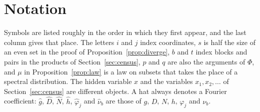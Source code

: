 \documentclass[11pt]{amsart}
\theoremstyle{remark}
\begin{document}
\appendix
\section{Notation}\label{app:notation}

Symbols are listed roughly in the order in which they first appear, and the last column gives that place. The letters $i$ and $j$ index coordinates, $s$ is half the size of an even set in the proof of Proposition~\ref{prop:diverge}, $b$ and $t$ index blocks and pairs in the products of Section~\ref{sec:census}, $p$ and $q$ are also the arguments of $\Phi$, and $\mu$ in Proposition~\ref{prop:law} is a law on subsets that takes the place of a spectral distribution. The hidden variable $x$ and the variables $x_1,x_2,\dots$ of Section~\ref{sec:census} are different objects. A hat always denotes a Fourier coefficient: $\hat g$, $\hat D$, $\hat N$, $\hat h$, $\hat\varphi_j$ and $\hat\nu_b$ are those of $g$, $D$, $N$, $h$, $\varphi_j$ and $\nu_b$.
\end{document}
